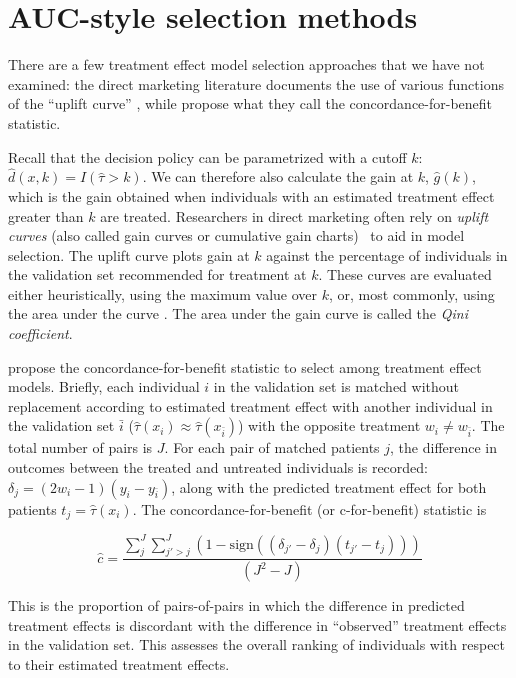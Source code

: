 \section{AUC-style selection methods}

\label{other}

There are a few treatment effect model selection approaches that we have not examined: the direct marketing literature documents the use of various functions of the ``uplift curve'' \cite{Gutierrez:2016tq}, while \citet{vanKlaveren:2018gg} propose what they call the concordance-for-benefit statistic. 

Recall that the decision policy can be parametrized with a cutoff $k$: $\hat d(x,k) = I(\hat\tau>k)$. We can therefore also calculate the gain at $k$, $\hat g(k)$, which is the gain obtained when individuals with an estimated treatment effect greater than $k$ are treated. Researchers in direct marketing often rely on \emph{uplift curves} (also called gain curves or cumulative gain charts) \ to aid in model selection. The uplift curve plots gain at $k$ against the percentage of individuals in the validation set recommended for treatment at $k$. These curves are evaluated either heuristically, using the maximum value over $k$, or, most commonly, using the area under the curve \cite{Gutierrez:2016tq}. The area under the gain curve is called the \emph{Qini coefficient}.

\citet{vanKlaveren:2018gg} propose the concordance-for-benefit statistic to select among treatment effect models. Briefly, each individual $i$ in the validation set is matched without replacement according to estimated treatment effect with another individual in the validation set $\bar{i}$ ($\hat\tau(x_i) \approx \hat\tau(x_{\bar i})$) with the opposite treatment $w_i \ne w_{\bar i}$. The total number of pairs is $J$. For each pair of matched patients $j$, the difference in outcomes between the treated and untreated individuals is recorded: $\delta_j = (2w_i - 1)(y_i -y_{\bar i})$, along with the predicted treatment effect for both patients $t_j = \hat\tau(x_i)$. The concordance-for-benefit (or c-for-benefit) statistic is

\[
\hat c = \frac{\sum_j^J \sum_{j' > j}^J (1 - \text{sign}((\delta_{j'} - \delta_j)(t_{j'} - t_j))) }{(J^2-J)}
\]

This is the proportion of pairs-of-pairs in which the difference in predicted treatment effects is discordant with the difference in ``observed'' treatment effects in the validation set. This assesses the overall ranking of individuals with respect to their estimated treatment effects.

